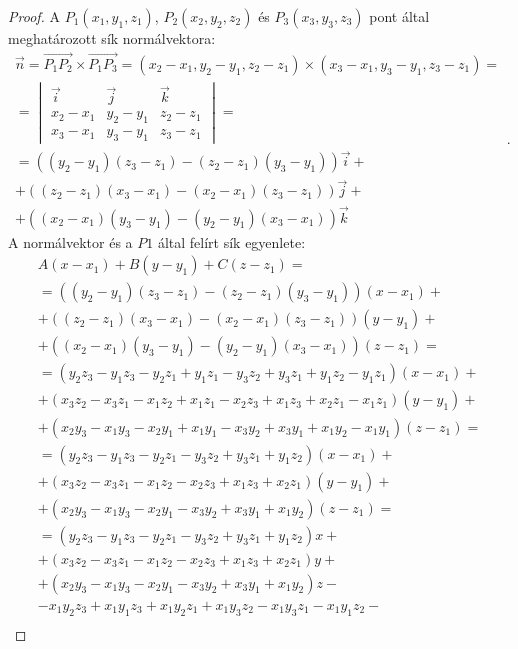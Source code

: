 \begin{proof}
	A $P_1(x_1, y_1, z_1)$, $P_2(x_2, y_2, z_2)$ és $P_3(x_3, y_3, z_3)$ pont által meghatározott sík normálvektora:
	\[
	\begin{array}{c}
		\vec{n}=\overrightarrow{P_1 P_2}\times\overrightarrow{P_1 P_3}=(x_2-x_1, y_2-y_1, z_2-z_1)\times(x_3-x_1, y_3-y_1, z_3-z_1)=\\
		=
		\begin{vmatrix}
			\vec{i} & \vec{j} & \vec{k} \\
			x_2-x_1 & y_2-y_1 & z_2-z_1 \\
			x_3-x_1 & y_3-y_1 & z_3-z_1
		\end{vmatrix}=\\
		= ((y_2-y_1)(z_3-z_1)-(z_2-z_1)(y_3-y_1))\vec{i}+\\
		+ ((z_2-z_1)(x_3-x_1)-(x_2-x_1)(z_3-z_1))\vec{j}+\\
		+ ((x_2-x_1)(y_3-y_1)-(y_2-y_1)(x_3-x_1))\vec{k}
	\end{array}.
	\]
	A normálvektor és a $P1$ által felírt sík egyenlete:
	\[
	\begin{array}{c}
		A(x-x_1)+B(y-y_1)+C(z-z_1)=\\
		=((y_2-y_1)(z_3-z_1)-(z_2-z_1)(y_3-y_1))(x-x_1)+\\
		+((z_2-z_1)(x_3-x_1)-(x_2-x_1)(z_3-z_1))(y-y_1)+\\
		+((x_2-x_1)(y_3-y_1)-(y_2-y_1)(x_3-x_1))(z-z_1)=\\
		=(y_2 z_3 - y_1 z_3 - y_2 z_1 + y_1 z_1 - y_3 z_2 + y_3 z_1 + y_1 z_2 - y_1 z_1)(x-x_1)+\\
		+(x_3 z_2 - x_3 z_1 - x_1 z_2 + x_1 z_1 - x_2 z_3 + x_1 z_3 + x_2 z_1 - x_1 z_1)(y-y_1)+\\
		+(x_2 y_3 - x_1 y_3 - x_2 y_1 + x_1 y_1 - x_3 y_2 + x_3 y_1 + x_1 y_2 - x_1 y_1)(z-z_1)=\\
		=(y_2 z_3 - y_1 z_3 - y_2 z_1 - y_3 z_2 + y_3 z_1 + y_1 z_2)(x-x_1)+\\
		+(x_3 z_2 - x_3 z_1 - x_1 z_2 - x_2 z_3 + x_1 z_3 + x_2 z_1)(y-y_1)+\\
		+(x_2 y_3 - x_1 y_3 - x_2 y_1 - x_3 y_2 + x_3 y_1 + x_1 y_2)(z-z_1)=\\
		=(y_2 z_3 - y_1 z_3 - y_2 z_1 - y_3 z_2 + y_3 z_1 + y_1 z_2)x+\\
		+(x_3 z_2 - x_3 z_1 - x_1 z_2 - x_2 z_3 + x_1 z_3 + x_2 z_1)y+\\
		+(x_2 y_3 - x_1 y_3 - x_2 y_1 - x_3 y_2 + x_3 y_1 + x_1 y_2)z-\\
		- x_1 y_2 z_3 + x_1 y_1 z_3 + x_1 y_2 z_1 + x_1 y_3 z_2 - x_1 y_3 z_1 - x_1 y_1 z_2 -\\

\end{array}\]
\end{proof}
